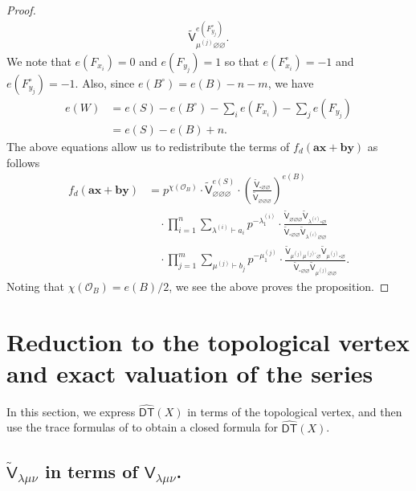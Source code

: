 \documentclass[12pt]{amsart}
\theoremstyle{definition}
\renewcommand{\O}{\mathcal{O}}
\newcommand{\sfV}{\mathsf{V}}
\newcommand{\sfVtilde}{\widetilde{\mathsf{V}}}
\newcommand{\DT}{\mathsf{DT}}
\newcommand{\boldx}{\boldsymbol{x}}
\newcommand{\boldy}{\boldsymbol{y}}
\newcommand{\bolda}{\boldsymbol{a}}
\newcommand{\boldb}{\boldsymbol{b}}
\renewcommand{\emptyset}{\varnothing}
\newcommand{\DThat}{\widehat{\DT}}
\newcommand{\bx}{\square}
\newcommand{\mujprime}{\mu^{(j)\prime}}
\begin{document}
\begin{proof}
\begin{align*}
\sfVtilde^{e(F^{\circ}_{y_{j}})}_{\mu^{(j)}\emptyset \emptyset}.
\end{align*}
We note that $e(F_{x_{i}})=0$ and $e(F_{y_{j}})=1$ so that
$e(F^{\circ }_{x_{i}})=-1$ and $e(F^{\circ }_{y_{j}})=-1$. Also,
since $e(B^{\circ}) = e(B)-n-m$, we have
\begin{align*}
e(W)&= e(S) - e(B^{\circ}) - \sum_{i} e(F_{x_{i}}) - \sum_{j} e(F_{y_{j}})\\
&= e(S) - e(B) +n.
\end{align*}
The above equations allow us to redistribute the terms of
$f_{d}(\bolda \boldx +\boldb \boldy )$ as follows
\begin{align*}
f_{d}(\bolda \boldx +\boldb \boldy ) &= p^{\chi (\O_{B})} \cdot
\sfVtilde^{e(S)}_{\emptyset \emptyset \emptyset} \cdot
\left(\frac{\sfVtilde_{\bx \emptyset \emptyset}}{\sfVtilde_{\emptyset
\emptyset \emptyset}} \right)^{e(B)} \\
&\quad \cdot \prod_{i=1}^{n} \sum_{\lambda^{(i)} \vdash a_{i}}
p^{-\lambda_{1}^{(i)}} \cdot \frac{\sfVtilde_{\emptyset \emptyset
\emptyset} \sfVtilde_{\lambda^{(i)} \bx  \emptyset}}{\sfVtilde_{\bx
\emptyset \emptyset} \sfVtilde_{\lambda^{(i)}\emptyset \emptyset}} \\
&\quad \cdot \prod_{j=1}^{m} \sum_{\mu^{(j)} \vdash b_{j}}
p^{-\mu_{1}^{(j)}} \cdot \frac{\sfVtilde_{\mu^{(j)} \mujprime
\emptyset} \sfVtilde_{\mu^{(j)} \bx \emptyset}}{\sfVtilde_{\bx
\emptyset \emptyset} \sfVtilde_{\mu^{(j)}\emptyset \emptyset}}.
\end{align*}
Noting that $\chi (\O_{B}) = e(B)/2$, we see the above proves the proposition.
\end{proof}


\section{Reduction to the topological vertex and exact valuation of
the series} \label{sec: reduction to the vertex}

In this section, we express $\DThat (X)$ in terms of the topological
vertex, and then use the trace formulas of \cite{Bryan-Kool-Young} to
obtain a closed formula for $\DThat (X)$.

\subsection{$\sfVtilde_{\lambda \mu \nu}$ in terms of $\sfV_{\lambda
\mu \nu}$.}
\end{document}
